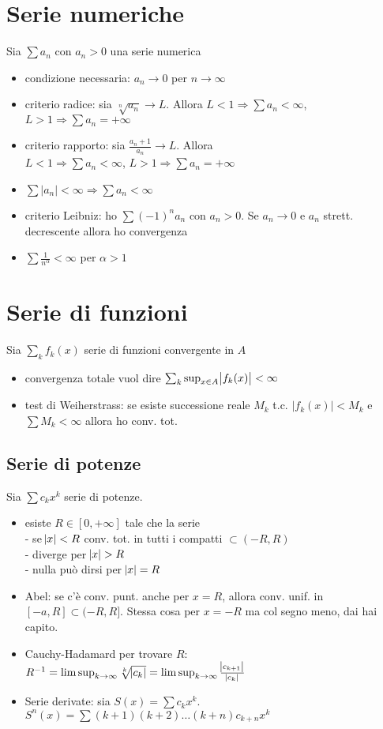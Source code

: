 \documentclass[a4paper,portrait,columns=3,5pt]{cheatsheet}
\begin{document}
\section{Serie numeriche}
Sia $\sum a_n$ con $a_n > 0$ una serie numerica
\begin{itemize}
    \item condizione necessaria: $a_n \rightarrow 0$ per $n \rightarrow \infty$
    \item criterio radice: sia $ \sqrt[n]{a_n} \rightarrow L$. Allora $L<1 \Rightarrow \sum a_n< \infty$, $L>1 \Rightarrow \sum a_n = + \infty$
    \item criterio rapporto: sia $\frac{a_n+1}{a_n} \rightarrow L$. Allora \\$L<1 \Rightarrow \sum a_n< \infty$, $L>1 \Rightarrow \sum a_n = + \infty$
    \item $\sum \left| a_n \right| < \infty \Rightarrow \sum a_n< \infty$
    \item criterio Leibniz: ho $\sum (-1)^n a_n$ con $a_n > 0$. Se $a_n \rightarrow 0$ e $a_n$ strett. decrescente allora ho convergenza
    \item $\sum \frac{1}{n^\alpha} < \infty$ per $\alpha > 1$
    
\end{itemize}

\section{Serie di funzioni}
Sia $\sum_k f_k(x)$ serie di funzioni convergente in $A$
\begin{itemize}
    \item convergenza totale vuol dire $\sum_k \sup_{x \in A} \abs{f_k(x)} < \infty$
    \item test di Weiherstrass: se esiste successione reale $M_k$ t.c. $\left|f_k(x)\right| < M_k$ e $\sum M_k < \infty$ allora ho conv. tot.
\end{itemize}
\subsection{Serie di potenze}
Sia $\sum c_k x^k$ serie di potenze.
\begin{itemize}
    \item esiste $R \in [0, +\infty]$ tale che la serie \\- se $\abs{x} < R$ conv. tot. in tutti i compatti $\subset (-R, R)$\\- diverge per $\abs{x} > R$\\ - nulla può dirsi per $\abs{x} = R$
    \item Abel: se c'è conv. punt. anche per $x = R$, allora conv. unif. in $[-a, R] \subset (-R, R]$. Stessa cosa per $x=-R$ ma col segno meno, dai hai capito.
    \item Cauchy-Hadamard per trovare $R$: \\ $R^{-1} = \limsup_{k\rightarrow \infty} \sqrt[k]{\abs{c_k}} = \limsup_{k \rightarrow \infty} \frac{\abs{c_{k+1}}}{\abs{c_k}}$
    \item Serie derivate: sia $S(x) = \sum c_k x^k$. $S^n(x) = \sum (k+1)(k+2)\dots (k+n) c_{k+n} x^k$
\end{itemize}
\end{document}
